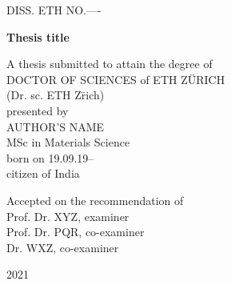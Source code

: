 \begin{titlepage}


\begin{center}
		
{\Large DISS. ETH NO.----}\\
\vspace{2cm}


	{\Large \bfseries Thesis title}
	\vspace{3cm}
	

{\large A thesis submitted to attain the degree of\\
	
	\MakeUppercase{Doctor of sciences} of \MakeUppercase{ETH Z\"urich}\\
	
	(Dr. sc. ETH Z\"rich)\\ 
	
	
	\vspace{2.cm}
	presented by\\
	
	\vspace{.4cm}
	\MakeUppercase{Author's Name}\\
	
	MSc in Materials Science\\\vspace{.4cm}
	born on 19.09.19--\\
	citizen of India\\
	\vspace{3cm}
	
	Accepted on the recommendation of\\\vspace{.6cm}
	Prof. Dr. XYZ, examiner\\
	Prof. Dr. PQR, co-examiner\\
	Dr. WXZ, co-examiner
}
\vfill
2021
\end{center}


\blankpage
\restoregeometry







\end{titlepage}
